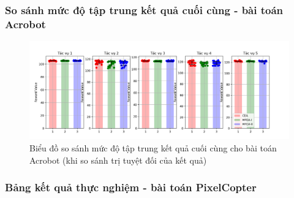 \subsubsection{So sánh mức độ tập trung kết quả cuối cùng - bài toán Acrobot}
\begin{figure}[h!]
    \centering
    \includegraphics[width=\textwidth,height=\textheight,keepaspectratio]{thesis/images/results/rl/acrobot_final.png}
    \caption{Biểu đồ so sánh mức độ tập trung kết quả cuối cùng cho bài toán Acrobot (khi so sánh trị tuyệt đối của kết quả)}
    \label{fig:Acrobot}
\end{figure}


\subsubsection{Bảng kết quả thực nghiệm - bài toán PixelCopter}
\begin{table} [h!]
    \begin{center}
    \caption{Kết quả huấn luyện các tác vụ cho bài toán PixelCopter}

    \end{center}
    \label{tab:result:pixelcopter}
\end{table}



